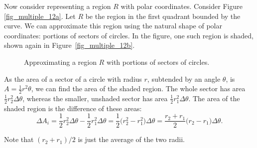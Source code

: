Now consider representing a region $R$ with polar coordinates. Consider Figure \ref{fig_multiple_12a}. Let $R$ be the region in the first quadrant bounded by the curve. We can approximate this region using the natural shape of polar coordinates: portions of sectors of circles. In the figure, one such region is shaded, shown again in Figure~\ref{fig_multiple_12b}.

\begin{figure}
\centering
\qquad
{}
\caption{Approximating a region $R$ with portions of sectors of circles.}
\end{figure}

As the area of a sector of a circle with radius $r$, subtended by an angle $\theta$, is $A = \frac12r^2\theta$, we can find the area of the shaded region. The whole sector has area $\frac12r_2^2\Delta \theta$, whereas the smaller, unshaded sector has area $\frac12r_1^2\Delta \theta$. The area of the shaded region is the difference of these areas:
$$\Delta A_i = \frac12r_2^2\Delta\theta-\frac12r_1^2\Delta\theta = \frac12\big(r_2^2-r_1^2\big) \Delta\theta = \frac{r_2+r_1}{2}\big(r_2-r_1\big) \Delta\theta.$$

Note that $(r_2+r_1)/2$ is just the average of the two radii. 

